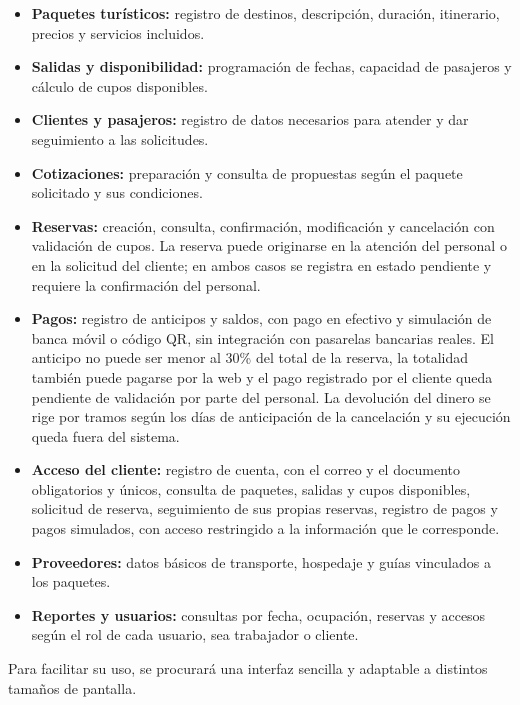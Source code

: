 \begin{itemize}
  \item \textbf{Paquetes turísticos:} registro de destinos, descripción,
        duración, itinerario, precios y servicios incluidos.
  \item \textbf{Salidas y disponibilidad:} programación de fechas, capacidad
        de pasajeros y cálculo de cupos disponibles.
  \item \textbf{Clientes y pasajeros:} registro de datos necesarios para
        atender y dar seguimiento a las solicitudes.
  \item \textbf{Cotizaciones:} preparación y consulta de propuestas según el
        paquete solicitado y sus condiciones.
  \item \textbf{Reservas:} creación, consulta, confirmación, modificación y
        cancelación con validación de cupos. La reserva puede originarse en la
        atención del personal o en la solicitud del cliente; en ambos casos se
        registra en estado pendiente y requiere la confirmación del personal.
  \item \textbf{Pagos:} registro de anticipos y saldos, con pago en efectivo y
        simulación de banca móvil o código QR, sin integración con pasarelas
        bancarias reales. El anticipo no puede ser menor al 30\% del total de
        la reserva, la totalidad también puede pagarse por la web y el pago
        registrado por el cliente queda pendiente de validación por parte del
        personal. La devolución del dinero se rige por tramos según los días
        de anticipación de la cancelación y su ejecución queda fuera del
        sistema.
  \item \textbf{Acceso del cliente:} registro de cuenta, con el correo y el
        documento obligatorios y únicos, consulta de paquetes,
        salidas y cupos disponibles, solicitud de reserva, seguimiento de sus
        propias reservas, registro de pagos y pagos simulados, con acceso
        restringido a la información que le corresponde.
  \item \textbf{Proveedores:} datos básicos de transporte, hospedaje y guías
        vinculados a los paquetes.
  \item \textbf{Reportes y usuarios:} consultas por fecha, ocupación, reservas
        y accesos según el rol de cada usuario, sea trabajador o cliente.
\end{itemize}

Para facilitar su uso, se procurará una interfaz sencilla y adaptable a
distintos tamaños de pantalla.

